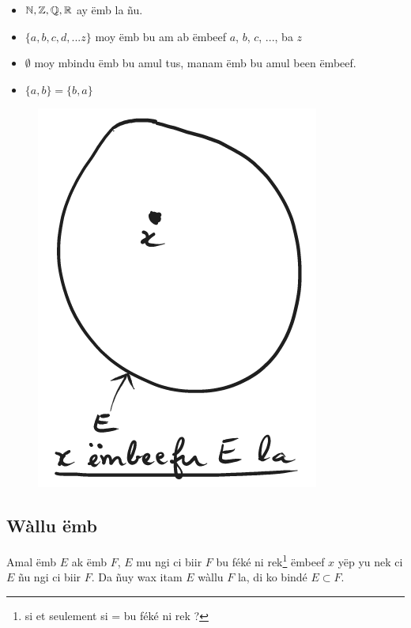\documentclass[twoside, a4paper]{article}
\begin{document}
\begin{itemize}
    \item $\mathbb{N}, \mathbb{Z}, \mathbb{Q}, \mathbb{R}$ ay ëmb la ñu.
    \item $\{a, b, c, d, ... z\}$ moy ëmb bu am ab ëmbeef $a$, $b$, $c$, ..., ba $z$
    \item $\emptyset$ moy mbindu ëmb bu amul tus, manam ëmb bu amul been ëmbeef.
    \item $\{a, b\} = \{b, a\}$
\end{itemize}
\begin{figure}[ht]
    \centering
    \includegraphics[scale = 0.5]{image/embeefu_emb.png}
    \label{fig:embeefu_emb}
\end{figure}



\subsection{Wàllu ëmb}
\begin{tcolorbox}[enhanced jigsaw,breakable,pad at break*=1mm,
  colback=red!5!white,colframe=white!75!black,title= Téeki,
  watermark color=white]
Amal ëmb $E$ ak ëmb $F$, $E$ mu ngi ci biir $F$ bu féké ni rek\footnote{si et seulement si = bu féké ni rek ?} ëmbeef $x$ yëp yu nek ci $E$ ñu ngi ci biir $F$. Da ñuy wax itam $E$ wàllu $F$ la, di ko bindé $E \subset F$. 
\end{tcolorbox}
\end{document}
